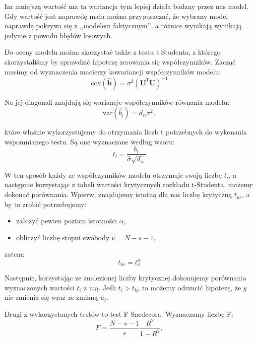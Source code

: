 \documentclass[11pt, a4paper]{article}
\begin{document}
Im mniejszą wartość ma ta wariancja tym lepiej działa badany przez nas model. Gdy wartość jest naprawdę mała można przypuszczać, że wybrany model naprawdę pokrywa się z ,,modelem faktycznym'', a różnice wynikają wynikają jedynie z powodu błędów losowych.



Do oceny modelu można skorzystać także z testu t Studenta, z którego skorzystaliśmy by sprawdzić hipotezę zerowania się współczynników. Zacząć musimy od wyznaczenia macierzy kowariancji współczynników modelu:
\begin{equation}
	\text{cov}\left( \hat{\mathbf{b}} \right) = 
	\sigma^2 \left( \mathbf{U}^T \mathbf{U} \right)^{-1}
\end{equation}

Na jej diagonali znajdują się wariancje współczynników równania modelu:
\begin{equation}
	\text{var}\left( \hat{b_i} \right) = 
	d_{ii} \sigma^2,
\end{equation}

które właśnie wykorzystujemy do otrzymania liczb t potrzebnych do wykonania wspomnianego testu. Są one wyznaczane według wzoru:
\begin{equation}
	t_i = \frac{b_i}{\hat{\sigma} \sqrt{d_{ii}}}
\end{equation}

W ten sposób każdy ze współczynników modelu otrzymuje swoją liczbę $t_i$, a następnie korzystając
z tabeli wartości krytycznych rozkładu t-Studenta, możemy dokonać porównania. Wpierw, znajdujemy
istotną dla nas liczbę krytyczną $t_{kr}$, a by to zrobić potrzebujemy:
\begin{itemize}
\item założyć pewien poziom istotności $\alpha$,
\item obliczyć liczbę stopni swobody $\nu = N - s - 1$,
\end{itemize}

zatem:
\begin{equation}
	t_{kr} = t^{\alpha}_{\nu}
\end{equation}

Następnie, korzystając ze znalezionej liczby krytycznej dokonujemy porównania wyznaczonych wartości $t_i$ z nią. Jeśli $t_i > t_{kr}$ to możemy odrzucić hipotezę, że $y$ nie zmienia się wraz ze zmianą $u_i$.

Drugi z wykorzystanych testów to test F Snedecora. Wyznaczamy liczbę F:
\begin{equation}
	F = \frac{N - s - 1}{s} \frac{R^2}{1 - R^2},
\end{equation}
\end{document}
